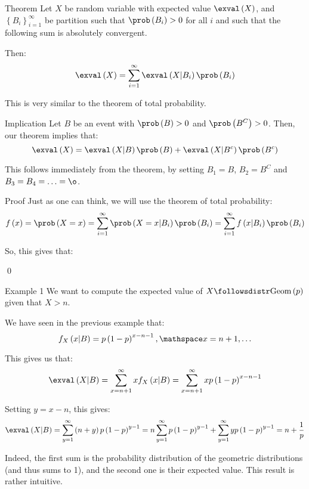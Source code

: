 \documentclass[a4paper]{article}
\begin{document}
\begin{parag}{Theorem}
    Let $X$ be random variable with expected value $\exval\left(X\right)$, and $\left\{B_i\right\}_{i=1}^{\infty}$ be partition such that $\prob\left(B_i\right) > 0$ for all $i$ and such that the following sum is absolutely convergent.

    Then: 
    \[\exval\left(X\right) = \sum_{i=1}^{\infty} \exval\left(X |B_i\right)\prob\left(B_i\right)\]

    This is very similar to the theorem of total probability.
    
    \begin{subparag}{Implication}
        Let $B$ be an event with $\prob\left(B\right) > 0$ and $\prob\left(B^C\right) > 0$. Then, our theorem implies that: 
        \[\exval\left(X\right) = \exval\left(X|B\right)\prob\left(B\right) + \exval\left(X | B^c\right)\prob\left(B^c\right)\]

        This follows immediately from the theorem, by setting $B_1 = B$, $B_2 = B^C$ and $B_3 = B_4 = \ldots = \o$.
    \end{subparag}

    \begin{subparag}{Proof}
        Just as one can think, we will use the theorem of total probability: 
        \[f\left(x\right) = \prob\left(X = x\right) = \sum_{i=1}^{\infty} \prob\left(X = x | B_i\right) \prob\left(B_i\right) = \sum_{i = 1}^{\infty} f\left(x | B_i\right)\prob\left(B_i\right)\]
        
        So, this gives that: 

        \qed
    \end{subparag}
\end{parag}

\begin{parag}{Example 1}
    We want to compute the expected value of $X \followsdistr \text{Geom}\left(p\right)$ given that $X > n$.

    We have seen in the previous example that: 
    \[f_X\left(x | B\right) = p\left(1-p\right)^{x-n-1}, \mathspace x = n+1, \ldots\]
    
    This gives us that: 
    \[\exval\left(X | B\right) = \sum_{x=n+1}^{\infty} x f_X\left(x|B\right) = \sum_{x=n+1}^{\infty} xp\left(1-p\right)^{x-n-1}\]
    
    Setting $y = x -n$, this gives: 
    \[\exval\left(X | B\right) = \sum_{y=1}^{\infty} \left(n+y\right)p\left(1-p\right)^{y-1} = n \sum_{y=1}^{\infty} p\left(1-p\right)^{y-1} + \sum_{y=1}^{\infty} yp\left(1-p\right)^{y-1} = n + \frac{1}{p}\]
    
    Indeed, the first sum is the probability distribution of the geometric distributions (and thus sums to 1), and the second one is their expected value. This result is rather intuitive.
\end{parag}
\end{document}
